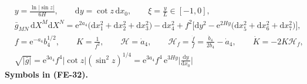 \documentclass[
  10pt,
]{article}
\begin{document}
\[
\begin{aligned}
&y = \frac{\ln\lvert\sin z\rvert}{6H},\qquad \mathrm{d}y = \cot z\,\mathrm{d}x_0,\qquad \xi =
 \frac{y}{L}\in[-1, 0],\\
&\bar g_{MN}\,\mathrm{d}X^M\mathrm{d}X^N = \mathrm{e}^{2a_4}\big(\mathrm{d}x_1^2 + \mathrm{d}x_2^2 +
 \mathrm{d}x_3^2\big)
 - \mathrm{d}x_4^2 + f^2\Big[\mathrm{d}y^2 - \mathrm{e}^{2Hy}\big(\mathrm{d}x_5^2 + \mathrm{d}x_6^2 +
 \mathrm{d}x_7^2\big)\Big],\\
&f = \mathrm{e}^{-a_4}b_4^{1/2},\qquad K = \frac{1}{f^2},\qquad \mathcal{H} = \dot a_4,\qquad
 \mathcal{H}_f = \frac{\dot f}{f} = \frac{\dot b_4}{2b_4} - \dot a_4,\qquad \dot K = -2K\mathcal{H}_f,\\
&\sqrt{\lvert\bar g\rvert} = \mathrm{e}^{3a_4}f^4\lvert\cot z\rvert(\sin^2z)^{1/4}
 = \mathrm{e}^{3a_4}f^4\,\mathrm{e}^{3Hy}\Big\lvert\frac{\mathrm{d}y}{\mathrm{d}x_0}\Big\rvert
\end{aligned} \tag{FE-32}
\] \textbf{Symbols in (FE-32).}
\end{document}
